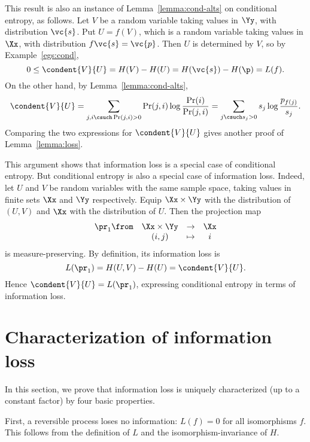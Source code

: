 \begin{remark}
This result is also an instance of
Lemma~\ref{lemma:cond-alts} on conditional%
%
%
% 
entropy, as follows.  Let $V$ be a random variable taking values in $\Yy$,
with distribution $\vc{s}$.  Put $U = f(V)$, which is a random variable
taking values in $\Xx$, with distribution $f\vc{s} = \vc{p}$.  Then $U$ is
determined by $V$, so by Example~\ref{egs:cond},
\[
0 
\leq 
\condent{V}{U} 
= 
H(V) - H(U) 
=
H(\vc{s}) - H(\p)
=
L(f).
\]
On the other hand, by Lemma~\ref{lemma:cond-alts},
\[
\condent{V}{U}
=
\sum_{j, i \csuch \Pr(j, i) > 0} \Pr(j, i) \log \frac{\Pr(i)}{\Pr(j, i)}
=
\sum_{j \csuch s_j > 0} s_j \log \frac{p_{f(j)}}{s_j}.
\]
Comparing the two expressions for $\condent{V}{U}$ gives another proof of
Lemma~\ref{lemma:loss}.

This argument shows that information loss is a special case of conditional
entropy.  But conditional entropy is also a special case of information
loss.  Indeed, let $U$ and $V$ be random variables with the same sample
space, taking values in finite sets $\Xx$ and $\Yy$ respectively.  Equip
$\Xx \times \Yy$ with the distribution of $(U, V)$ and $\Xx$ with the
distribution of $U$.  Then the projection map
\[
\begin{array}{cccc}
\pr_1 \from     &\Xx \times \Yy &\to            &\Xx    \\
                &(i, j)         &\mapsto        &i
\end{array}
\]
is measure-preserving.  By definition, its information loss is 
\[
L(\pr_1) = H(U, V) - H(U) = \condent{V}{U}.
\]
Hence $\condent{V}{U} = L(\pr_1)$,
expressing conditional entropy in terms of information loss.
\end{remark}


\section{Characterization of information loss}


In this section, we prove that information loss is uniquely characterized
(up to a constant factor) by four basic properties.  

First, a reversible process%
%
% 
loses no information: $L(f) = 0$ for all isomorphisms $f$.  This follows
from the definition of $L$ and the isomorphism-invariance of $H$.

